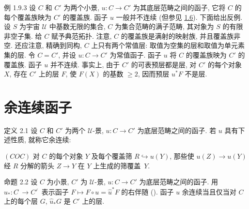\begin{enonce*}[remark]{例 1.9.3}
设 $C$ 和 $C'$ 为两个小景, $u:C\rightarrow C'$ 为其底层范畴之间的函子,
它将 $C$ 的每个覆盖族映为 $C'$ 的覆盖族.
函子 $u$ 一般并不连续 (但参见 \hyperref[III.prop1.6]{1.6}).
下面给出反例. 设 $S$ 为宇宙 $𝒰$ 中基数无限的集合,
$C$ 为集合范畴的满子范畴, 其对象为 $S$ 的有限非空子集.
给 $C$ 赋予典范拓扑. 注意, $C$ 的覆盖族是满射的映射族, 并且覆盖族非空.
还应注意, 精确到同构, $C$ 上只有两个常值层:
取值为空集的层和取值为单元素集的层.
令 $C=C'$, 并设 $u:C\rightarrow C'$ 为常值函子.
函子 $u$ 将 $C$ 的覆盖族映为 $C'$ 的覆盖族. 函子 $u$ 并不连续.
事实上, 由于 $C'$ 的可表预层都是层, 对 $C'$ 的每个对象 $X$,
存在 $C'$ 上的层\pageoriginale{} $F$, 使 $F(X)$ 的基数 $\geq 2$,
因而预层 $u^\ast F$ 不是层.
\end{enonce*}




\section{余连续函子}

\begin{enonce*}{定义 2.1}
设 $C$ 和 $C'$ 为两个 $𝒰$-景, $u:C\rightarrow C'$ 为底层范畴之间的函子.
若 $u$ 具有下述性质, 就称它余连续:

$(COC)$ 对 $C$ 的每个对象 $Y$ 及每个覆盖筛 $R\hookrightarrow u(Y)$,
那些使 $u(Z)\rightarrow u(Y)$ 经 $R$ 分解的箭头 $Z\rightarrow Y$
在 $Y$ 上生成的筛覆盖~$Y$.
\end{enonce*}

\begin{enonce*}{命题 2.2}
设 $C$ 为小景, $C'$ 为 $𝒰$-景, $u:C\rightarrow C'$ 为底层范畴之间的函子.
用 $\widehat{u}_{\ast}:C^{\widehat{\phantom{,}}}\rightarrow {C'}^{\widehat{\phantom{,}}}$
表示函子 $F\mapsto F\circ u=\widehat{u}^{\ast}F$ 的右伴随
{\rm ().}
函子 $u$ 余连续当且仅当对 $C$ 上的每个层 $G$, $\widehat{u}_{\ast}G$ 是 $C'$ 上的层.
\end{enonce*}

